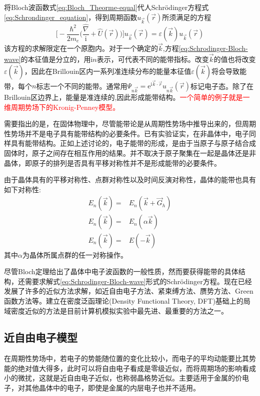 将Bloch波函数式\eqref{eq:Bloch_Theorme-equal}代人Schr\"odinger方程式\eqref{eq:Schrondinger_equation}，得到周期函数$u_{\vec k}(\vec r)$所须满足的方程
\begin{equation}
	\bigg[-\dfrac{\hbar^2}{2m_e}\bigg(\dfrac{\hat{\nabla}}{\mathrm{i}}+\hat{U}(\vec r)\bigg)\bigg]u_{\vec k}(\vec r)=\varepsilon(\vec k)u_{\vec k}(\vec r)
	\label{eq:Schrodinger-Bloch-wave}
\end{equation}
该方程的求解限定在一个原胞内。对于一个确定的$\vec k$,方程\eqref{eq:Schrodinger-Bloch-wave}的本征值是分立的，用i$n$表示，可代表不同的能带指标。改变$\vec k$的值也将改变$\varepsilon(\vec k)$，因此在Brillouin区内一系列准连续分布的能量本征值$\varepsilon(\vec k)$将会导致能带，每个$n$标志一个不同的能带。通常用$\Psi_{n\vec k}=\mathrm{e}^{\mathrm{i}\vec k\cdot\vec r}u_{n\vec k}(\vec r)$标记电子态。除了在Brillouin区边界上，能量是准连续的,因此形成能带结构。\textcolor{red}{一个简单的例子就是一维周期势场下的Kronig-Penney模型。}%

需要指出的是，在固体物理中，尽管能带论是从周期性势场中推导出来的，但周期性势场并不是电子具有能带结构的必要条件。已有实验证实，在非晶体中，电子同样具有能带结构。正如上述讨论的，电子能带的形成，是由于当原子与原子结合成固体时，原子之间存在相互作用的结果。并不取决于原子聚集在一起是晶体还是非晶体，即原子的排列是否具有平移对称性并不是形成能带的必要条件。

由于晶体具有的平移对称性、点群对称性以及时间反演对称性，晶体的能带也具有如下对称性:
\begin{equation}
	\begin{aligned}
		E_n(\vec k)=&E_n(\vec k+\vec G_h)\\
		E_n(\vec k)=&E_n(\alpha\vec k)\\
E_n(\vec k)=&E(-\vec k)
	\end{aligned}
	\label{eq:E_band-symmetry}
\end{equation}
其中$\alpha$为晶体所属点群的任一对称操作。

尽管Bloch定理给出了晶体中电子波函数的一般性质，然而要获得能带的具体结构，还需要求解式\eqref{eq:Schrodinger-Bloch-wave}形式的Schr\"odinger方程。现在已经发展了许多的近似方法求解，如近自由电子方法、紧束缚方法、赝势方法、Green函数方法等。建立在密度泛函理论(Density Functional Theory, DFT)基础上的局域密度近似的方法是目前计算机模拟实验中最先进、最重要的方法之一。%

\subsection{近自由电子模型} 
在周期性势场中，若电子的势能随位置的变化比较小，而电子的平均动能要比其势能的绝对值大得多，此时可以将自由电子看成是零级近似，而将周期场的影响看成小的微扰，这就是近自由电子近似，也称弱晶格势近似。主要适用于金属的价电子，对其他晶体中的电子，即使是金属的内层电子也并不适用。

